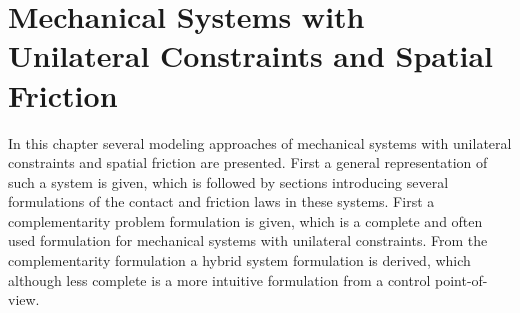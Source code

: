 \documentclass[../DC2017114Bouma.tex]{subfiles}
\begin{document}
\graphicspath{{02_Material/img/}}
\pagestyle{fancyreport}
\cleartooddpage
\pagestyle{fancyreport}
\chapter{Mechanical Systems with Unilateral Constraints and Spatial Friction}
In this chapter several modeling approaches of mechanical systems with unilateral constraints and spatial friction are presented. First a general representation of such a system is given, which is followed by sections introducing several formulations of the contact and friction laws in these systems. First a complementarity problem formulation is given, which is a complete and often used formulation for mechanical systems with unilateral constraints. From the complementarity formulation a hybrid system formulation is derived, which although less complete is a more intuitive formulation from a control point-of-view.
\end{document}
